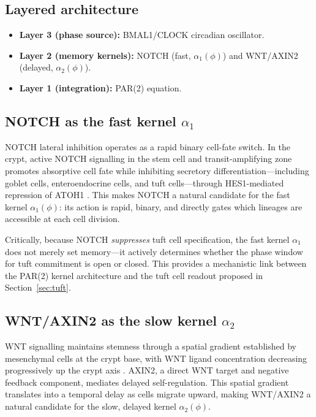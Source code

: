 \documentclass[11pt,letterpaper]{article}
\theoremstyle{definition}
\theoremstyle{remark}
\begin{document}
\subsection{Layered architecture}

\begin{itemize}
\item \textbf{Layer 3 (phase source):} BMAL1/CLOCK circadian oscillator.
\item \textbf{Layer 2 (memory kernels):} NOTCH (fast, $\alpha_1(\phi)$) and WNT/AXIN2 (delayed, $\alpha_2(\phi)$).
\item \textbf{Layer 1 (integration):} PAR(2) equation.
\end{itemize}

\subsection{NOTCH as the fast kernel $\alpha_1$}

NOTCH lateral inhibition operates as a rapid binary cell-fate switch. In the crypt, active NOTCH signalling in the stem cell and transit-amplifying zone promotes absorptive cell fate while inhibiting secretory differentiation---including goblet cells, enteroendocrine cells, and tuft cells---through HES1-mediated repression of ATOH1 \citep{nguyen2025colonic, vanderflier2009notch}. This makes NOTCH a natural candidate for the fast kernel $\alpha_1(\phi)$: its action is rapid, binary, and directly gates which lineages are accessible at each cell division.

Critically, because NOTCH \textit{suppresses} tuft cell specification, the fast kernel $\alpha_1$ does not merely set memory---it actively determines whether the phase window for tuft commitment is open or closed. This provides a mechanistic link between the PAR(2) kernel architecture and the tuft cell readout proposed in Section~\ref{sec:tuft}.

\subsection{WNT/AXIN2 as the slow kernel $\alpha_2$}

WNT signalling maintains stemness through a spatial gradient established by mesenchymal cells at the crypt base, with WNT ligand concentration decreasing progressively up the crypt axis \citep{nguyen2025colonic}. AXIN2, a direct WNT target and negative feedback component, mediates delayed self-regulation. This spatial gradient translates into a temporal delay as cells migrate upward, making WNT/AXIN2 a natural candidate for the slow, delayed kernel $\alpha_2(\phi)$.
\end{document}
